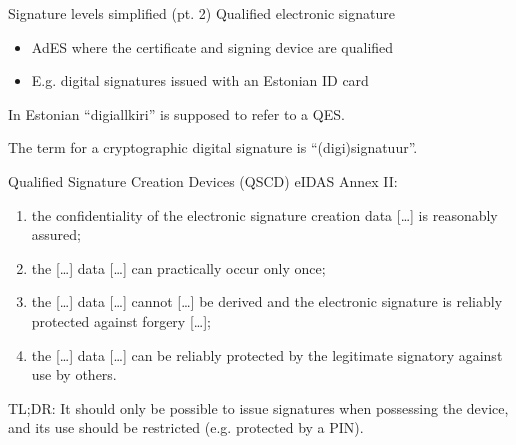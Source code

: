 \begin{frame}{Signature levels simplified (pt. 2)}
  \pause
  Qualified electronic signature
  \begin{itemize}[<+(1)->]
    \item AdES where the certificate and signing device are qualified
    \item E.g. digital signatures issued with an Estonian ID card
  \end{itemize}

  \vspace*{1em}

  \pause
  In Estonian \enquote{digiallkiri} is supposed to refer to a QES.

  The term for a cryptographic digital signature is \enquote{(digi)signatuur}.
\end{frame}

\begin{frame}{Qualified Signature Creation Devices (QSCD)}
  \pause
  eIDAS Annex II:
  \settowidth{\offset}{1.a}
  \addtolength{\leftmargini}{\offset}
  \begin{enumerate}[<+(1)->]
    \item[(1.a)] the confidentiality of the electronic signature creation data [\dots] is reasonably assured;
    \item[(1.b)] the [\dots] data [\dots] can practically occur only once;
    \item[(1.c)] the [\dots] data [\dots] cannot [\dots] be derived and the electronic signature is reliably protected against forgery [\dots];
    \item[(1.d)] the [\dots] data [\dots] can be reliably protected by the legitimate signatory against use by others.
  \end{enumerate}

  \pause
  TL;DR: It should only be possible to issue signatures when possessing the device, and its use should be restricted (e.g. protected by a PIN).
\end{frame}


